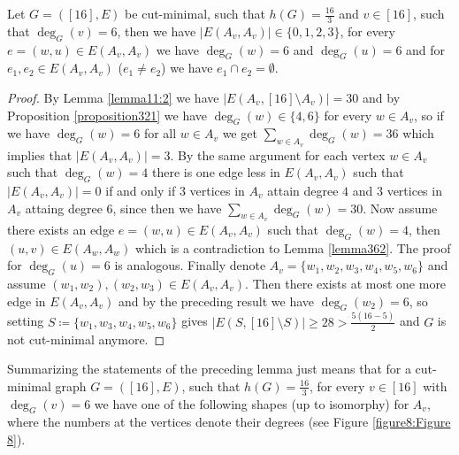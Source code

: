 \begin{lem}\label{lemma364}
Let \(G=([16],E)\) be cut-minimal, such that \(h(G)=\frac{16}{3}\) and \(v\in [16]\), such that \(\deg_G(v)=6\), then we have \(|E(A_v,A_v)|\in\{0,1,2,3\}\), for every \(e=(w,u)\in E(A_v,A_v)\) we have \(\deg_G(w)=6\) and \(\deg_G(u)=6\) and for \(e_1,e_2\in E(A_v,A_v)\) (\(e_1\neq e_2\)) we have \(e_1\cap e_2=\emptyset\).
\begin{proof}
By Lemma \ref{lemma11:2} we have \(|E(A_v,[16]\setminus A_v)|=30\) and by Proposition \ref{proposition321} we have \(\deg_G(w)\in\{4,6\}\) for every \(w\in A_v\), so if we have \(\deg_G(w)=6\) for all \(w\in A_v\) we get \(\sum\limits_{w\in A_v}\deg_G(w)=36\) which implies that \(|E(A_v,A_v)|=3\). By the same argument for each vertex \(w\in A_v\) such that \(\deg_G(w)=4\) there is one edge less in \(E(A_v,A_v)\) such that \(|E(A_v,A_v)|=0\) if and only if \(3\) vertices in \(A_v\) attain degree \(4\) and \(3\) vertices in \(A_v\) attaing degree \(6\), since then we have \(\sum\limits_{w\in A_v}\deg_G(w)=30\). Now assume there exists an edge \(e=(w,u)\in E(A_v,A_v)\) such that \(\deg_G(w)=4\), then \((u,v)\in E(A_w,A_w)\) which is a contradiction to Lemma \ref{lemma362}. The proof for \(\deg_G(u)=6\) is analogous. Finally denote \(A_v=\{w_1,w_2,w_3,w_4,w_5,w_6\}\) and assume \((w_1,w_2),(w_2,w_3)\in E(A_v,A_v)\). Then there exists at most one more edge in \(E(A_v,A_v)\) and by the preceding result we have \(\deg_G(w_2)=6\), so setting \(S\coloneqq\{w_1,w_3,w_4,w_5,w_6\}\) gives \(|E(S,[16]\setminus S)|\geq 28>\frac{5(16-5)}{2}\) and \(G\) is not cut-minimal anymore.
\end{proof}
\end{lem}

Summarizing the statements of the preceding lemma just means that for a cut-minimal graph \(G=([16],E)\), such that \(h(G)=\frac{16}{3}\), for every \(v\in [16]\) with \(\deg_G(v)=6\) we have one of the following shapes (up to isomorphy) for \(A_v\), where the numbers at the vertices denote their degrees (see Figure \ref{figure8:Figure 8}).

\newpage



